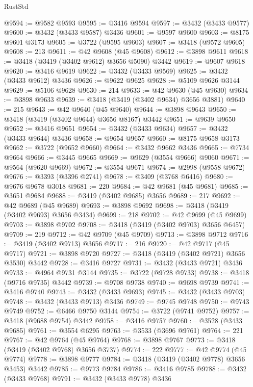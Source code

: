 \begin{lexlean}{RustStd}
\begin{coremodule}
@9594 := @9582 @9593
@9595 := @3416 @9594
@9597 := @3432 (@3433 @9577)
@9600 := @3432 (@3433 @9587) @3436
@9601 := @9597 @9600
@9603 := @8175 @9601 @3173
@9605 := @3722 (@9595 @9603)
@9607 := @3418 (@9572 @9605)
@9608 := 213
@9611 := @42 @9608 (@45 @9608)
@9612 := @3898 @9611
@9618 := @3418 (@3419 (@3402 @9612) @3656 @5090) @3442
@9619 := @9607 @9618
@9620 := @3416 @9619
@9622 := @3432 (@3433 @9569)
@9625 := @3432 (@3433 @9612) @3436
@9626 := @9622 @9625
@9628 := @5109 @9626 @3144
@9629 := @5106 @9628
@9630 := 214
@9633 := @42 @9630 (@45 @9630)
@9634 := @3898 @9633
@9639 := @3418 (@3419 (@3402 @9634) @3656 @3881)
@9640 := 215
@9643 := @42 @9640 (@45 @9640)
@9644 := @3898 @9643
@9650 := @3418 (@3419 (@3402 @9644) @3656 @8167) @3442
@9651 := @9639 @9650
@9652 := @3416 @9651
@9654 := @3432 (@3433 @9634)
@9657 := @3432 (@3433 @9644) @3436
@9658 := @9654 @9657
@9660 := @8175 @9658 @3173
@9662 := @3722 (@9652 @9660)
@9664 := @3432 @9662 @3436
@9665 := @7734 @9664
@9666 := @3445 @9665
@9669 := @9629 (@3554 @9666) @9060
@9671 := @9564 (@9620 @9669)
@9672 := @3554 @9671
@9674 := @2998 (@9558 @9672)
@9676 := @3393 (@3396 @2741)
@9678 := @3409 (@3768 @6416)
@9680 := @9676 @9678 @3018
@9681 := 220
@9684 := @42 @9681 (@45 @9681)
@9685 := @3651 @9684
@9688 := @3419 (@3402 @9685) @3656
@9689 := 217
@9692 := @42 @9689 (@45 @9689)
@9693 := @3898 @9692
@9698 := @3418 (@3419 (@3402 @9693) @3656 @3434)
@9699 := 218
@9702 := @42 @9699 (@45 @9699)
@9703 := @3898 @9702
@9708 := @3418 (@3419 (@3402 @9703) @3656 @6457)
@9709 := 219
@9712 := @42 @9709 (@45 @9709)
@9713 := @3898 @9712
@9716 := @3419 (@3402 @9713) @3656
@9717 := 216
@9720 := @42 @9717 (@45 @9717)
@9721 := @3898 @9720
@9727 := @3418 (@3419 (@3402 @9721) @3656 @3530) @3442
@9728 := @3416 @9727
@9731 := @3432 (@3433 @9721) @3436
@9733 := @4964 @9731 @3144
@9735 := @3722 (@9728 @9733)
@9738 := @3418 (@9716 @9735) @3442
@9739 := @9708 @9738
@9740 := @9698 @9739
@9741 := @3416 @9740
@9743 := @3432 (@3433 @9693)
@9745 := @3432 (@3433 @9703)
@9748 := @3432 (@3433 @9713) @3436
@9749 := @9745 @9748
@9750 := @9743 @9749
@9752 := @6466 @9750 @3144
@9754 := @3722 (@9741 @9752)
@9757 := @3418 (@9688 @9754) @3442
@9758 := @3416 @9757
@9760 := @3528 (@3433 @9685)
@9761 := @3554 @6295
@9763 := @3533 (@3696 @9761)
@9764 := 221
@9767 := @42 @9764 (@45 @9764)
@9768 := @3898 @9767
@9773 := @3418 (@3419 (@3402 @9768) @3656 @3737)
@9774 := 222
@9777 := @42 @9774 (@45 @9774)
@9778 := @3898 @9777
@9784 := @3418 (@3419 (@3402 @9778) @3656 @3453) @3442
@9785 := @9773 @9784
@9786 := @3416 @9785
@9788 := @3432 (@3433 @9768)
@9791 := @3432 (@3433 @9778) @3436

\end{coremodule}
\end{lexlean}
